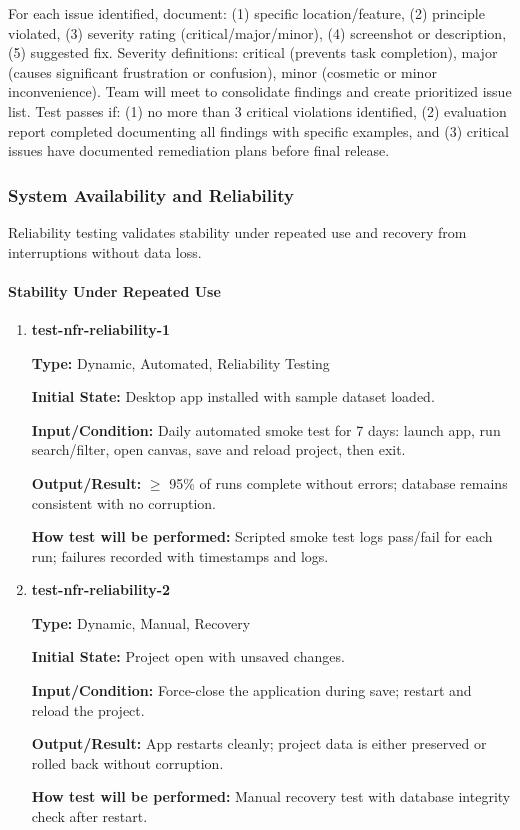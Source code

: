 \documentclass[12pt, titlepage]{article}
\begin{document}
\begin{enumerate}
For each issue identified, document: (1) specific location/feature, (2) principle violated, (3) severity rating (critical/major/minor), (4) screenshot or description, (5) suggested fix. Severity definitions: critical (prevents task completion), major (causes significant frustration or confusion), minor (cosmetic or minor inconvenience). Team will meet to consolidate findings and create prioritized issue list. Test passes if: (1) no more than 3 critical violations identified, (2) evaluation report completed documenting all findings with specific examples, and (3) critical issues have documented remediation plans before final release.

\end{enumerate}

\subsubsection{System Availability and Reliability}

Reliability testing validates stability under repeated use and recovery from interruptions without data loss.

\paragraph{Stability Under Repeated Use}

\begin{enumerate}

\item \textbf{test-nfr-reliability-1}

\textbf{Type:} Dynamic, Automated, Reliability Testing

\textbf{Initial State:} Desktop app installed with sample dataset loaded.

\textbf{Input/Condition:} Daily automated smoke test for 7 days: launch app, run search/filter, open canvas, save and reload project, then exit.

\textbf{Output/Result:} $\geq$ 95\% of runs complete without errors; database remains consistent with no corruption.

\textbf{How test will be performed:} Scripted smoke test logs pass/fail for each run; failures recorded with timestamps and logs.

\item \textbf{test-nfr-reliability-2}

\textbf{Type:} Dynamic, Manual, Recovery

\textbf{Initial State:} Project open with unsaved changes.

\textbf{Input/Condition:} Force-close the application during save; restart and reload the project.

\textbf{Output/Result:} App restarts cleanly; project data is either preserved or rolled back without corruption.

\textbf{How test will be performed:} Manual recovery test with database integrity check after restart.

\end{enumerate}
\end{document}
